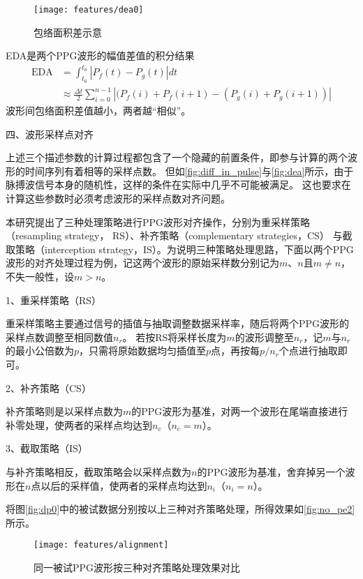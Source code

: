 \begin{figure}[htbp]
  \centering
  \texttt{[image: features/dea0]}
  \caption[包络面积差示意]{\label{fig:dea}包络面积差示意}
\end{figure}

EDA是两个PPG波形的幅值差值的积分结果
\begin{equation}
    \label{equ:dea}
    \begin{aligned}
        \text{EDA} &= \int_{t_0}^{t_n}|P_f(t)-P_g(t)|dt\\
        &\approx \frac{\Delta t}{2} \sum_{i=0}^{n-1}{|(P_f(i)+P_f(i+1)-(P_g(i)+P_g(i+1))|}
    \end{aligned}
\end{equation}
波形间包络面积差值越小，两者越“相似”。

四、波形采样点对齐

上述三个描述参数的计算过程都包含了一个隐藏的前置条件，即参与计算的两个波形的时间序列有着相等的采样点数。
但如\autoref{fig:diff_in_pulse}与\autoref{fig:dea}所示，由于脉搏波信号本身的随机性，这样的条件在实际中几乎不可能被满足。
这也要求在计算这些参数时必须考虑波形的采样点数对齐问题。

本研究提出了三种处理策略进行PPG波形对齐操作，分别为重采样策略（resampling strategy， RS）、补齐策略（complementary strategies，CS）
与截取策略（interception strategy，IS）。为说明三种策略处理思路，下面以两个PPG波形的对齐处理过程为例，记这两个波形的原始采样数分别记为$m$、$n$且$m \neq n$，不失一般性，设$m>n$。

1、重采样策略（RS）

重采样策略主要通过信号的插值与抽取调整数据采样率，随后将两个PPG波形的采样点数调整至相同数值$n_r$。
若按RS将采样长度为$m$的波形调整至$n_r$，记$m$与$n_r$的最小公倍数为$p$，只需将原始数据均匀插值至$p$点，再按每$p/n_r$个点进行抽取即可。

2、补齐策略（CS）

补齐策略则是以采样点数为$m$的PPG波形为基准，对两一个波形在尾端直接进行补零处理，使两者的采样点均达到$n_c$（$n_c=m$）。

3、截取策略（IS）

与补齐策略相反，截取策略会以采样点数为$n$的PPG波形为基准，舍弃掉另一个波形在$n$点以后的采样值，使两者的采样点均达到$n_i$（$n_i=n$）。

将图\autoref{fig:dp0}中的被试数据分别按以上三种对齐策略处理，所得效果如\autoref{fig:no_pe2}所示。

\begin{figure}[htbp]
  \centering
  \texttt{[image: features/alignment]}
  \caption{\label{fig:no_pe2}同一被试PPG波形按三种对齐策略处理效果对比}
\end{figure}

